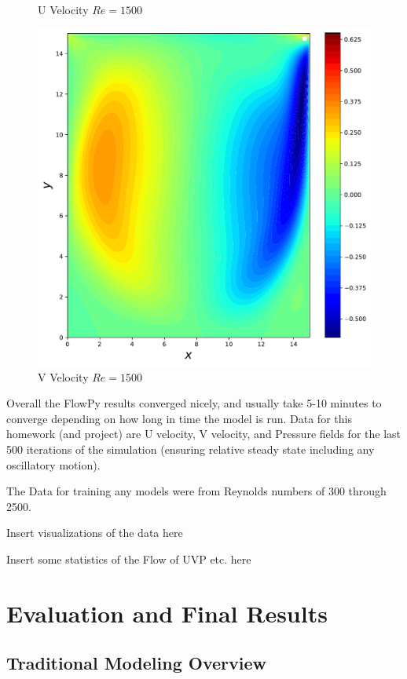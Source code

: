 \documentclass{article}
\begin{document}
\begin{figure}[htb!]
	\caption{U Velocity $Re = 1500$}
	\label{fig:u_example2}
	\endminipage\hfill
	\includegraphics[width=\linewidth]{./images/Re1500FlowPy_pres_v}
	\caption{V Velocity $Re = 1500$}
	\label{fig:v_example2}

	\endminipage
\end{figure}

Overall the FlowPy results converged nicely, and usually take 5-10 minutes
to converge depending on how long in time the model is run. Data for this
homework (and project) are U velocity, V velocity, and Pressure fields for the
last 500 iterations of the simulation (ensuring relative steady state including
any oscillatory motion).

The Data for training any models were from Reynolds numbers of 300
through 2500.

Insert visualizations of the data here

Insert some statistics of the Flow of UVP etc. here

\section{Evaluation and Final Results} \label{results}

\subsection{Traditional Modeling Overview} \label{traditional}
\end{document}

